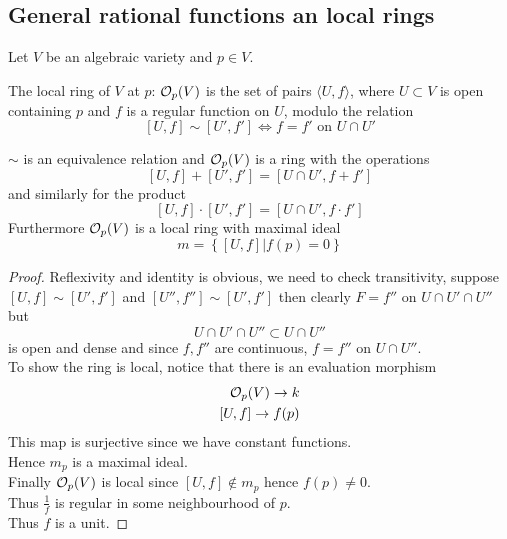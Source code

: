 \documentclass[../main.tex]{subfiles}
\begin{document}
\subsection{General rational functions an local rings}
Let $V$ be an algebraic variety and $p\in V$.\\
\begin{defn}
	The local ring of $V$ at $p$: $\mathcal{O}_p( V) $  is the set of pairs $ \langle U, f\rangle$, where $U \subset V$ is open containing $p$ and $f$ is a regular function on $U$, modulo the relation
	\[ 
		 [ U,f ] \sim [  U',f' ] \iff f=f' \text{ on } U\cap U'
	\]
	
\end{defn}
\begin{lemma}
$\sim$ is an equivalence relation and $\mathcal{O}_p( V) $ is a ring with the operations
\[ 
[ U,f] + [ U',f'] = [ U\cap U', f+f'] 
\]
and similarly for the product
\[ 
	[ U,f] \cdot [ U',f'] = [ U\cap U', f\cdot f'] 
\]
Furthermore $\mathcal{O}_p( V)$ is a local ring with maximal ideal
\[ 
m = \left\{ [ U,f] | f( p) =0 \right\} 
\]

\end{lemma}
\begin{proof}
	Reflexivity and identity is obvious, we need to check transitivity, suppose $ [ U,f] \sim [ U',f'] $ and $[U'',f''] \sim [ U',f'] $ then clearly $F= f''$ on $U\cap U'\cap U''$ but 
	\[ 
	U\cap U' \cap U'' \subset U\cap U''
	\]
	is open and dense and since $f,f''$ are continuous, $f=f''$ on $U\cap U''$.\\
	To show the ring is local, notice that there is an evaluation morphism
	\begin{align*}
	\mathcal{O}_p( V) \to k \\
	[ U,f] \to f( p) 
	\end{align*}
This map is surjective since we have constant functions.\\
Hence $m_p $ is a maximal ideal.\\
Finally $\mathcal{O}_p( V) $ is local since $ [ U,f] \notin m_p$ hence $f( p)\neq 0 $.\\
Thus $ \frac{1}{f}$ is regular in some neighbourhood of $p$.\\
Thus $f$ is a unit.
\end{proof}







	
\end{document}
